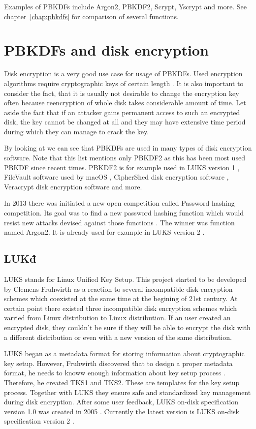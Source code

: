 \documentclass[nolof]{fithesis3}
\begin{document}
Examples of PBKDFs include Argon2, PBKDF2, Scrypt, Yscrypt and more. See chapter~\ref{chap:pbkdfs} for comparison of several functions.

\section{PBKDFs and disk encryption}
Disk encryption is a very good use case for usage of PBKDFs. Used encryption algorithms require cryptographic keys of certain length \parencite{veracrypt}. It is also important to consider the fact, that it is usually not desirable to change the encryption key often because reencryption of whole disk takes considerable amount of time. Let aside the fact that if an attacker gains permanent access to such an encrypted disk, the key cannot be changed at all and they may have extensive time period during which they can manage to crack the key. 

By looking at \parencite{pbkdf2usage} we can see that PBKDFs are used in many types of disk encryption software. Note that this list mentions only PBKDF2 as this has been most used PBKDF since recent times. PBKDF2 is for example used in LUKS version 1 \parencite{luks1}, FileVault software used by macOS \parencite{filevault}, CipherShed disk encryption software \parencite{ciphershed}, Veracrypt disk encryption software \parencite{veracrypt} and more.

In 2013 there was initiated a new open competition called Password hashing competition. Its goal was to find a new password hashing function which would resist new attacks devised against those functions \parencite{phc}. The winner was function named Argon2. It is already used for example in LUKS version 2 \parencite{luks2}.

\subsection{LUKđ}
LUKS stands for Linux Unified Key Setup. This project started to be developed by Clemens Fruhwirth as a reaction to several incompatible disk encryption schemes which coexisted at the same time at the begining of 21st century. At certain point there existed three incompatible disk encryption schemes which varried from Linux distribution to Linux distribution. If an user created an encrypted disk, they couldn't be sure if they will be able to encrypt the disk with a different distribution or even with a new version of the same distribution.

LUKS began as a metadata format for storing information about cryptographic key setup. However, Fruhwirth discovered that to design a proper metadata format, he needs to knoww enough information about key setup process \parencite{newmethods}. Therefore, he created TKS1 and TKS2. These are templates for the key setup process. Together with LUKS they ensure safe and standardized key management during disk encryption. After some user feedback, LUKS on-disk specification version 1.0 was created in 2005 \parencite{luks1}. Currently the latest version is LUKS on-disk specification version 2 \parencite{luks2}.
\end{document}
